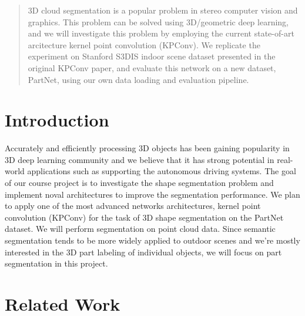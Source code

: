 \documentclass[11pt,twocolumn,letterpaper]{article}
\begin{document}
\maketitle






\begin{abstract}
    3D cloud segmentation is a popular problem in stereo computer vision and graphics. This problem can be solved using 3D/geometric deep learning, and we will investigate this problem by employing the current state-of-art arcitecture kernel point convolution (KPConv). We replicate the experiment on Stanford S3DIS indoor scene dataset presented in the original KPConv paper, and evaluate this network on a new dataset, PartNet, using our own data loading and evaluation pipeline. 
\end{abstract}

\section{Introduction}

Accurately and efficiently processing 3D objects has been gaining popularity in 3D deep learning community and we believe that it has strong potential in real-world applications such as supporting the autonomous driving systems. The goal of our course project is to investigate the shape segmentation problem and implement noval architectures to improve the segmentation performance. We plan to apply one of the most advanced networks architectures, kernel point convolution (KPConv) for the task of 3D shape segmentation on the PartNet dataset. We will perform segmentation on point cloud data. Since semantic segmentation tends to be more widely applied to outdoor scenes and we're mostly interested in the 3D part labeling of individual objects, we will focus on part segmentation in this project.


\section{Related Work}
\end{document}
